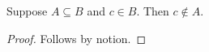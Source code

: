

\begin{proposition}\label{horn_negative_missing}
    Suppose $A\subseteq B$ and $c\in B$.
    Then $c\notin A$.
\end{proposition}
\begin{proof}
    Follows by notion.
\end{proof}

